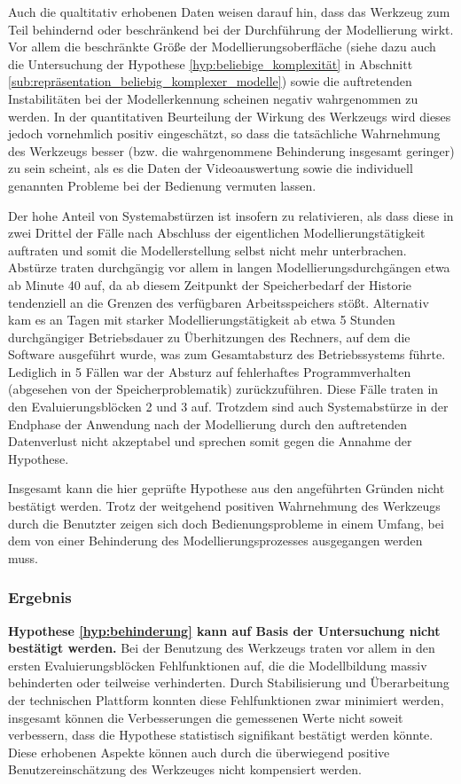 Auch die qualtitativ erhobenen Daten weisen darauf hin, dass das Werkzeug zum Teil behindernd oder beschränkend bei der Durchführung der Modellierung wirkt. Vor allem die beschränkte Größe der Modellierungsoberfläche (siehe dazu auch die Untersuchung der Hypothese \ref{hyp:beliebige_komplexität} in Abschnitt \ref{sub:repräsentation_beliebig_komplexer_modelle}) sowie die auftretenden Instabilitäten bei der Modellerkennung scheinen negativ wahrgenommen zu werden. In der quantitativen Beurteilung der Wirkung des Werkzeugs wird dieses jedoch vornehmlich positiv eingeschätzt, so dass die tatsächliche Wahrnehmung des Werkzeugs besser (bzw. die wahrgenommene Behinderung insgesamt geringer) zu sein scheint, als es die Daten der Videoauswertung sowie die individuell genannten Probleme bei der Bedienung vermuten lassen.

Der hohe Anteil von Systemabstürzen ist insofern zu relativieren, als dass diese in zwei Drittel der Fälle nach Abschluss der eigentlichen Modellierungstätigkeit auftraten und somit die Modellerstellung selbst nicht mehr unterbrachen. Abstürze traten durchgängig vor allem in langen Modellierungsdurchgängen etwa ab Minute 40 auf, da ab diesem Zeitpunkt der Speicherbedarf der Historie tendenziell an die Grenzen des verfügbaren Arbeitsspeichers stößt. Alternativ kam es an Tagen mit starker Modellierungstätigkeit ab etwa 5 Stunden durchgängiger Betriebsdauer zu Überhitzungen des Rechners, auf dem die Software ausgeführt wurde, was zum Gesamtabsturz des Betriebssystems führte. Lediglich in 5 Fällen war der Absturz auf fehlerhaftes Programmverhalten (abgesehen von der Speicherproblematik) zurückzuführen. Diese Fälle traten in den Evaluierungsblöcken 2 und 3 auf. Trotzdem sind auch Systemabstürze in der Endphase der Anwendung nach der Modellierung durch den auftretenden Datenverlust nicht akzeptabel und sprechen somit gegen die Annahme der Hypothese.

Insgesamt kann die hier geprüfte Hypothese aus den angeführten Gründen nicht bestätigt werden. Trotz der weitgehend positiven Wahrnehmung des Werkzeugs durch die Benutzter zeigen sich doch Bedienungsprobleme in einem Umfang, bei dem von einer Behinderung des Modellierungsprozesses ausgegangen werden muss.

\subsubsection{Ergebnis} 

\textbf{Hypothese \ref{hyp:behinderung} kann auf Basis der Untersuchung nicht bestätigt werden.} Bei der Benutzung des Werkzeugs traten vor allem in den ersten Evaluierungsblöcken Fehlfunktionen auf, die die Modellbildung massiv behinderten oder teilweise verhinderten. Durch Stabilisierung und Überarbeitung der technischen Plattform konnten diese Fehlfunktionen zwar minimiert werden, insgesamt können die Verbesserungen die gemessenen Werte nicht soweit verbessern, dass die Hypothese statistisch signifikant bestätigt werden könnte. Diese erhobenen Aspekte können auch durch die überwiegend positive Benutzereinschätzung des Werkzeuges nicht kompensiert werden.

